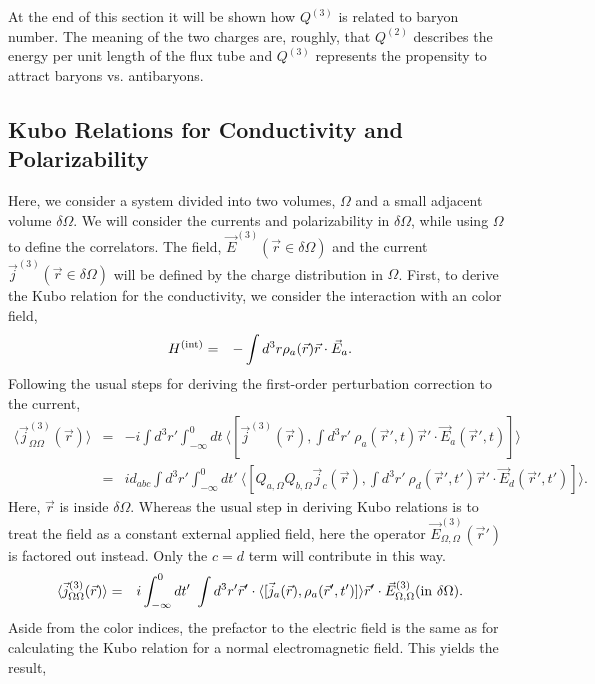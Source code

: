 \documentclass[aps, prc, 12pt, nofootinbib, showpacs, superscriptaddress, tightenlines, groupedaddress]{revtex4-2}
\begin{document}
At the end of this section it will be shown how $Q^{(3)}$ is related to baryon number. The meaning of the two charges are, roughly, that $Q^{(2)}$ describes the energy per unit length of the flux tube and $Q^{(3)}$ represents the propensity to attract baryons vs. antibaryons.

\subsection{Kubo Relations for Conductivity and Polarizability}

Here, we consider a system divided into two volumes, $\Omega$ and a small adjacent volume $\delta\Omega$. We will consider the currents and polarizability in $\delta\Omega$, while using $\Omega$ to define the correlators. The field, $\vec{E}^{(3)}(\vec{r}\in\delta\Omega)$ and the current $\vec{j}^{(3)}(\vec{r}\in\delta\Omega)$ will be defined by the charge distribution in $\Omega$. First, to derive the Kubo relation for the conductivity, we consider the interaction with an color field,
\begin{eqnarray}
H^{\rm(int)}&=&-\int d^3r \rho_a(\vec{r})\vec{r}\cdot\vec{E}_a.
\end{eqnarray}
Following the usual steps for deriving the first-order perturbation correction to the current,
\begin{eqnarray}
\langle\vec{j}^{(3)}_{\Omega\Omega}(\vec{r})\rangle&=&-i\int d^3r'\int_{-\infty}^0 dt~\langle[\vec{j}^{(3)}(\vec{r}),
\int d^3r'~\rho_a(\vec{r}',t)\vec{r}'\cdot\vec{E}_a(\vec{r}',t)]\rangle\\
\nonumber
&=&id_{abc}\int d^3r'\int_{-\infty}^0 dt'~\langle[Q_{a,\Omega}Q_{b,\Omega}\vec{j}_c(\vec{r}),
\int d^3r'~\rho_d(\vec{r}',t')\vec{r}'\cdot\vec{E}_d(\vec{r}',t')]\rangle.
\end{eqnarray}
Here, $\vec{r}$ is inside $\delta\Omega$. Whereas the usual step in deriving Kubo relations is to treat the field as a constant external applied field, here the operator $\vec{E}_{\Omega,\Omega}^{(3)}(\vec{r}')$ is factored out instead. Only the $c=d$ term will contribute in this way.
\begin{eqnarray}
\langle\vec{j}^{(3)}_{\Omega\Omega}(\vec{r})\rangle&=&i\int_{-\infty}^0dt'~\int d^3r'\vec{r}'\cdot
\langle[\vec{j}_a(\vec{r}),\rho_a(\vec{r}',t')]\rangle  \vec{r}'\cdot\vec{E}^{(3)}_{\Omega,\Omega}({\rm in}~\delta\Omega).
\end{eqnarray}
Aside from the color indices, the prefactor to the electric field is the same as for calculating the Kubo relation for a normal electromagnetic field. This yields the result,
\end{document}
